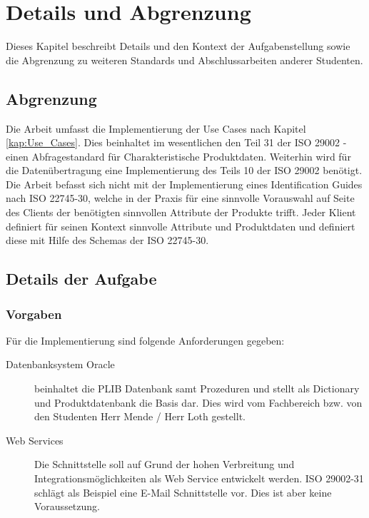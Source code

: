 \section{Details und Abgrenzung}

Dieses Kapitel beschreibt Details und den Kontext der Aufgabenstellung sowie die Abgrenzung zu weiteren Standards und Abschlussarbeiten anderer Studenten. 

\subsection{Abgrenzung}

Die Arbeit umfasst die Implementierung der Use Cases nach Kapitel \ref{kap:Use_Cases}. Dies beinhaltet im wesentlichen den Teil 31 der ISO 29002 - einen Abfragestandard für Charakteristische Produktdaten. Weiterhin wird für die Datenübertragung eine Implementierung des Teils 10 der ISO 29002 benötigt. Die Arbeit befasst sich nicht mit der Implementierung eines Identification Guides nach ISO 22745-30, welche in der Praxis für eine sinnvolle Vorauswahl auf Seite des Clients der benötigten sinnvollen Attribute der Produkte trifft. Jeder Klient definiert für seinen Kontext sinnvolle Attribute und Produktdaten und definiert diese mit Hilfe des Schemas der ISO 22745-30. 

\subsection{Details der Aufgabe}

\subsubsection{Vorgaben}

Für die Implementierung sind folgende Anforderungen gegeben:
\begin{description}
\item[Datenbanksystem Oracle] beinhaltet die PLIB Datenbank samt Prozeduren und stellt als Dictionary und Produktdatenbank die Basis dar. Dies wird vom Fachbereich bzw. von den Studenten Herr Mende / Herr Loth gestellt. 
\item[Web Services] Die Schnittstelle soll auf Grund der hohen Verbreitung und Integrationsmöglichkeiten als Web Service entwickelt werden. ISO 29002-31 schlägt als Beispiel eine E-Mail Schnittstelle vor.  Dies ist aber keine Voraussetzung. 
\end{description}


